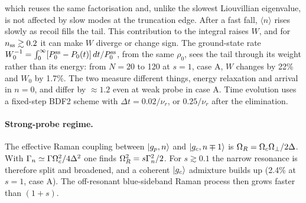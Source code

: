 \documentclass[10pt,twocolumn,a4paper]{article}
\begin{document}
which reuses the same factorisation and, unlike the slowest Liouvillian eigenvalue, is not affected by slow modes at the truncation edge. After a fast fall, $\langle n\rangle$ rises slowly as recoil fills the tail. This contribution to the integral raises $W$, and for $n_{\rm ss}\gtrsim0.2$ it can make $W$ diverge or change sign. The ground-state rate $W_0^{-1}=\int_0^\infty[P_0^{\rm ss}-P_0(t)]\,dt/P_0^{\rm ss}$, from the same $\rho_0$, sees the tail through its weight rather than its energy: from $N=20$ to 120 at $s=1$, case A, $W$ changes by 22\% and $W_0$ by 1.7\%. The two measure different things, energy relaxation and arrival in $n=0$, and differ by $\approx1.2$ even at weak probe in case A. Time evolution uses a fixed-step BDF2 scheme with $\Delta t=0.02/\nu_r$, or $0.25/\nu_r$ after the elimination.

\paragraph{Strong-probe regime.}
The effective Raman coupling between $|g_p,n\rangle$ and $|g_c,n\mp1\rangle$ is $\Omega_R=\Omega_c\Omega_\perp/2\Delta$. With $\Gamma_n\simeq\Gamma\Omega_c^2/4\Delta^2$ one finds $\Omega_R^2=s\Gamma_n^2/2$. For $s\gtrsim0.1$ the narrow resonance is therefore split and broadened, and a coherent $|g_c\rangle$ admixture builds up (2.4\% at $s=1$, case A). The off-resonant blue-sideband Raman process then grows faster than $(1+s)$.
\end{document}
